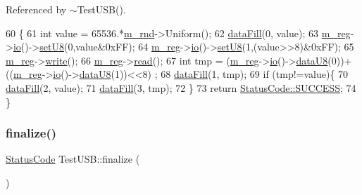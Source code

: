 Referenced by $\sim$\+Test\+U\+S\+B().


\begin{DoxyCode}
60                               \{
61   \textcolor{keywordtype}{int} value = 65536.*\hyperlink{classTestUSB_ac3ad0c22af51e67455f919474a658dbe}{m\_rnd}->Uniform();
62   \hyperlink{classProcessus_a0d093b48f3218a088ba030e24372f18c}{dataFill}(0, value);
63   \hyperlink{classTestUSB_a5f2bd3ef5db056bcfd803cb94d3a6587}{m\_reg}->\hyperlink{classIOobject_af04fb94137c3d86849f478ac5afab5d1}{io}()->\hyperlink{classIOdata_a6c4fb2f2af01889ada889c2b7aceb24d}{setU8}(0,value&0xFF);
64   \hyperlink{classTestUSB_a5f2bd3ef5db056bcfd803cb94d3a6587}{m\_reg}->\hyperlink{classIOobject_af04fb94137c3d86849f478ac5afab5d1}{io}()->\hyperlink{classIOdata_a6c4fb2f2af01889ada889c2b7aceb24d}{setU8}(1,(value>>8)&0xFF);
65   \hyperlink{classTestUSB_a5f2bd3ef5db056bcfd803cb94d3a6587}{m\_reg}->\hyperlink{classIOobject_a9f6984bc9f0fadcf800f1be2523ac744}{write}();
66   \hyperlink{classTestUSB_a5f2bd3ef5db056bcfd803cb94d3a6587}{m\_reg}->\hyperlink{classIOobject_aa07610c11963b1db6710e3c76ceea456}{read}();
67   \textcolor{keywordtype}{int} tmp = (\hyperlink{classTestUSB_a5f2bd3ef5db056bcfd803cb94d3a6587}{m\_reg}->\hyperlink{classIOobject_af04fb94137c3d86849f478ac5afab5d1}{io}()->\hyperlink{classIOdata_a75e9c318dbac3a39402179070943d4bc}{dataU8}(0))+((\hyperlink{classTestUSB_a5f2bd3ef5db056bcfd803cb94d3a6587}{m\_reg}->\hyperlink{classIOobject_af04fb94137c3d86849f478ac5afab5d1}{io}()->\hyperlink{classIOdata_a75e9c318dbac3a39402179070943d4bc}{dataU8}(1))<<8) ;
68   \hyperlink{classProcessus_a0d093b48f3218a088ba030e24372f18c}{dataFill}(1, tmp);
69   \textcolor{keywordflow}{if} (tmp!=value)\{
70     \hyperlink{classProcessus_a0d093b48f3218a088ba030e24372f18c}{dataFill}(2, value);
71     \hyperlink{classProcessus_a0d093b48f3218a088ba030e24372f18c}{dataFill}(3, tmp);
72   \}
73   \textcolor{keywordflow}{return} \hyperlink{classStatusCode_a6f565cbeadc76d14c72f047e5e85eb4badd0da38d3ba0d922efd1f4619bc37ad8}{StatusCode::SUCCESS};
74 \}
\end{DoxyCode}
\mbox{\label{classTestUSB_a24bb22d7203746e6c3b5669aa71e72f3}} 
\subsubsection{\texorpdfstring{finalize()}{finalize()}}
{\footnotesize\ttfamily \hyperlink{classStatusCode}{Status\+Code} Test\+U\+S\+B\+::finalize (\begin{DoxyParamCaption}{ }\end{DoxyParamCaption})\hspace{0.3cm}{\ttfamily [virtual]}}

